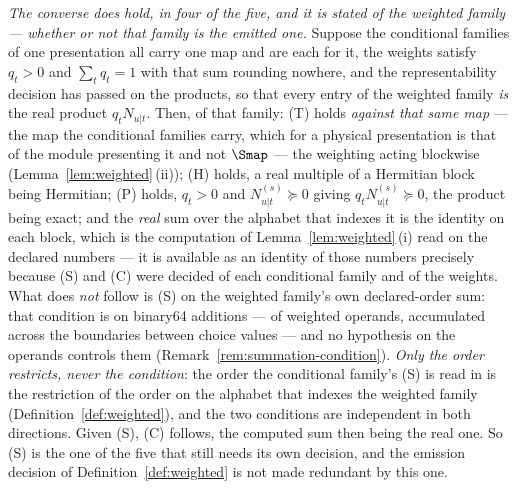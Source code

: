 \begin{remark}
\emph{The converse does hold, in four of the five, and it is stated of the
weighted family --- whether or not that family is the emitted one.} Suppose the
conditional families of one presentation all carry one map and are each
 for it, the weights satisfy $q_t>0$ and
$\sum_tq_t=1$ with that sum rounding nowhere, and the representability
decision has passed on the products, so that every entry of the weighted
family \emph{is} the real product $q_tN_{u|t}$. Then, of that family: (T)
holds \emph{against that same map} --- the map the conditional families
carry, which for a physical presentation is that of the module presenting it
and not $\Smap$ --- the weighting acting blockwise
(Lemma~\ref{lem:weighted}\,(ii)); (H) holds, a real multiple of a Hermitian
block being Hermitian; (P) holds, $q_t>0$ and $N_{u|t}^{(s)}\succeq0$ giving
$q_tN_{u|t}^{(s)}\succeq0$, the product being exact; and the \emph{real} sum
over the alphabet that indexes it is the
identity on each block, which is the computation of
Lemma~\ref{lem:weighted}\,(i) read on the declared numbers --- it is available
as an identity of those numbers precisely because (S) and (C) were decided of
each conditional family and of the weights. What does \emph{not} follow is (S)
on the weighted family's own declared-order sum: that condition is on binary64
additions --- of weighted operands, accumulated across the boundaries between
choice values --- and no hypothesis on the operands controls them
(Remark~\ref{rem:summation-condition}). \emph{Only the order restricts, never
the condition}: the order the conditional family's (S) is read in is the
restriction of the order on the alphabet that indexes the weighted family
(Definition~\ref{def:weighted}), and the two conditions are independent in
both directions. Given (S), (C) follows, the computed sum then being the real
one. So (S) is the one of the five that still needs its own decision, and the
emission decision of Definition~\ref{def:weighted} is not made redundant by
this one.


\end{remark}
